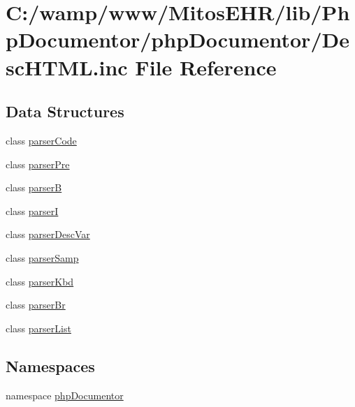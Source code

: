 \hypertarget{_desc_h_t_m_l_8inc}{\section{\-C\-:/wamp/www/\-Mitos\-E\-H\-R/lib/\-Php\-Documentor/php\-Documentor/\-Desc\-H\-T\-M\-L.inc \-File \-Reference}
\label{_desc_h_t_m_l_8inc}
}
\subsection*{\-Data \-Structures}
\begin{DoxyCompactItemize}
\item 
class \hyperlink{classparser_code}{parser\-Code}
\item 
class \hyperlink{classparser_pre}{parser\-Pre}
\item 
class \hyperlink{classparser_b}{parser\-B}
\item 
class \hyperlink{classparser_i}{parser\-I}
\item 
class \hyperlink{classparser_desc_var}{parser\-Desc\-Var}
\item 
class \hyperlink{classparser_samp}{parser\-Samp}
\item 
class \hyperlink{classparser_kbd}{parser\-Kbd}
\item 
class \hyperlink{classparser_br}{parser\-Br}
\item 
class \hyperlink{classparser_list}{parser\-List}
\end{DoxyCompactItemize}
\subsection*{\-Namespaces}
\begin{DoxyCompactItemize}
\item 
namespace \hyperlink{namespacephp_documentor}{php\-Documentor}
\end{DoxyCompactItemize}
